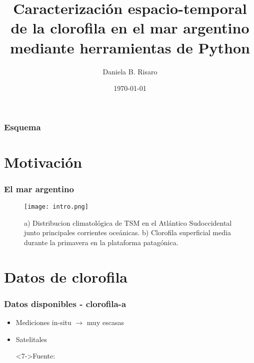 \documentclass{beamer}
\title[Python para SIG]{Caracterización espacio-temporal de la clorofila en el mar argentino mediante herramientas de Python}
\subtitle{}
\author[Risaro, Daniela B]{Daniela B. Risaro\inst{1} \inst{2}}
\institute[SHN-UBA] %
{
	\inst{1}%
	Departamento de Oceanografía\\
	Servicio de Hidrografía Naval (SHN)
	\and
	\inst{2}%
	Facultad de Cs Exactas y Naturales\\
	Universidad de Buenos Aires (UBA)
}
\date{\today}
\begin{document}
\begin{frame}
 \titlepage
\end{frame}

\begin{frame}
\frametitle{Esquema }
\tableofcontents
\end{frame} 

\section{Motivación}

\begin{frame}
 \frametitle{El mar argentino}
 
\begin{figure}
 \texttt{[image: intro.png]}
\caption{a) Distribucion climatológica de TSM en el Atlántico Sudoccidental junto principales corrientes oceánicas. b) Clorofila superficial media durante la primavera en la plataforma patagónica.}
 \end{figure}
\end{frame}


\section{Datos de clorofila}

\begin{frame}[t]
 \frametitle{Datos disponibles - clorofila-a}
 

  \begin{itemize}
   \item<1-> Mediciones in-situ \pause $\rightarrow$ muy escasas
   \item<3-> Satelitales 
      
   \begin{figure}
   	
   \end{figure}

\item[]<7->\tiny{Fuente: \href{https://oceancolor.gsfc.nasa.gov/docs/odps_opdsmp.may2018.pdf}{}}
  \end{itemize}
\end{frame}
\end{document}
